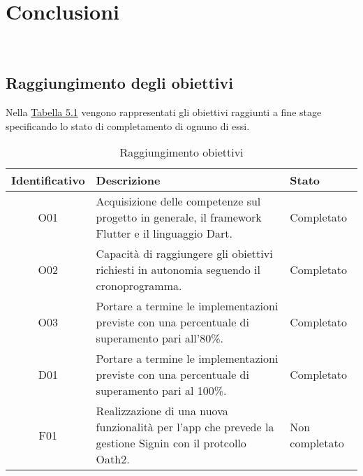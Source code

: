 
\chapter{Conclusioni}
\label{cap:conclusioni}

\\

\section{Raggiungimento degli obiettivi}
Nella \hyperref[tab:Raggiungimento obiettivi]{Tabella 5.1} vengono rappresentati gli obiettivi raggiunti a fine stage specificando lo stato di completamento di ognuno di essi.\\
\begin{center}
	\begin{table}[h!]
		
		\label{tab:Raggiungimento obiettivi}
		\begin{tabularx}{\textwidth}{|c|p{7cm}|p{2.4cm}|}
			
			\hline
			\textbf{Identificativo} & \centering\textbf{Descrizione} & \textbf{Stato}  \\\hline
			
			O01 & Acquisizione delle competenze sul progetto in generale, il framework Flutter e il linguaggio Dart.  & Completato\\
			\hline
			O02 & Capacità di raggiungere gli obiettivi richiesti in autonomia seguendo il cronoprogramma.  & Completato\\
			\hline	
			O03 & Portare a termine le implementazioni previste con una percentuale di superamento pari all’80\%.  & Completato\\
			\hline
			D01 & Portare a termine le implementazioni previste con una percentuale di superamento pari al 100\%.  & Completato\\
			\hline
			F01 & Realizzazione di una nuova funzionalità per l'app che prevede la gestione Signin con il protcollo Oath2. & Non completato\\
			\hline		
		\end{tabularx}
		\vspace{0.3cm}
		\caption{Raggiungimento obiettivi}
	\end{table}
\end{center}

